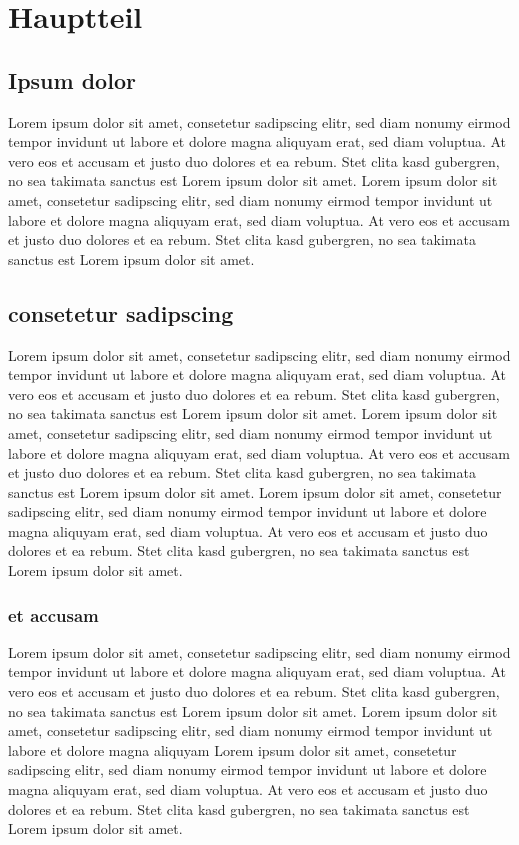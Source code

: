 \chapter{Hauptteil}
\label{sec:Hauptteil}

\section{Ipsum dolor}
Lorem ipsum dolor sit amet, consetetur sadipscing elitr, sed diam nonumy eirmod tempor invidunt ut labore et dolore magna aliquyam erat, sed diam voluptua. At vero eos et accusam et justo duo dolores et ea rebum. Stet clita kasd gubergren, no sea takimata sanctus est Lorem ipsum dolor sit amet. Lorem ipsum dolor sit amet, consetetur sadipscing elitr, sed diam nonumy eirmod tempor invidunt ut labore et dolore magna aliquyam erat, sed diam voluptua. At vero eos et accusam et justo duo dolores et ea rebum. Stet clita kasd gubergren, no sea takimata sanctus est Lorem ipsum dolor sit amet.

\section{consetetur sadipscing}
Lorem ipsum dolor sit amet, consetetur sadipscing elitr, sed diam nonumy eirmod tempor invidunt ut labore et dolore magna aliquyam erat, sed diam voluptua. At vero eos et accusam et justo duo dolores et ea rebum. Stet clita kasd gubergren, no sea takimata sanctus est Lorem ipsum dolor sit amet. Lorem ipsum dolor sit amet, consetetur sadipscing elitr, sed diam nonumy eirmod tempor invidunt ut labore et dolore magna aliquyam erat, sed diam voluptua. At vero eos et accusam et justo duo dolores et ea rebum. Stet clita kasd gubergren, no sea takimata sanctus est Lorem ipsum dolor sit amet. Lorem ipsum dolor sit amet, consetetur sadipscing elitr, sed diam nonumy eirmod tempor invidunt ut labore et dolore magna aliquyam erat, sed diam voluptua. At vero eos et accusam et justo duo dolores et ea rebum. Stet clita kasd gubergren, no sea takimata sanctus est Lorem ipsum dolor sit amet.

\newpage

\subsection{et accusam}
Lorem ipsum dolor sit amet, consetetur sadipscing elitr, sed diam nonumy eirmod tempor invidunt ut labore et dolore magna aliquyam erat, sed diam voluptua. At vero eos et accusam et justo duo dolores et ea rebum. Stet clita kasd gubergren, no sea takimata sanctus est Lorem ipsum dolor sit amet. Lorem ipsum dolor sit amet, consetetur sadipscing elitr, sed diam nonumy eirmod tempor invidunt ut labore et dolore magna aliquyam
 Lorem ipsum dolor sit amet, consetetur sadipscing elitr, sed diam nonumy eirmod tempor invidunt ut labore et dolore magna aliquyam erat, sed diam voluptua. At vero eos et accusam et justo duo dolores et ea rebum. Stet clita kasd gubergren, no sea takimata sanctus est Lorem ipsum dolor sit amet. 

